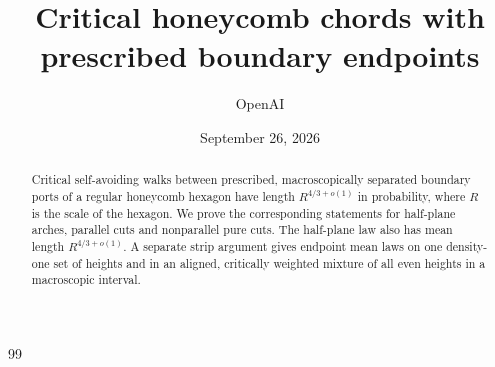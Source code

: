 \documentclass[11pt]{article}
\title{Critical honeycomb chords with prescribed boundary endpoints}
\author{OpenAI}\date{September 26, 2026}
\numberwithin{equation}{section}
\theoremstyle{definition}\newtheorem{definition}[theorem]{Definition}
\theoremstyle{remark}\newtheorem{remark}[theorem]{Remark}
\begin{document}
\maketitle
\begin{abstract}
Critical self-avoiding walks between prescribed, macroscopically separated boundary ports of a regular honeycomb hexagon have length $R^{4/3+o(1)}$ in probability, where $R$ is the scale of the hexagon. We prove the corresponding statements for half-plane arches, parallel cuts and nonparallel pure cuts. The half-plane law also has mean length $R^{4/3+o(1)}$. A separate strip argument gives endpoint mean laws on one density-one set of heights and in an aligned, critically weighted mixture of all even heights in a macroscopic interval.
\end{abstract}
\tableofcontents









\begin{thebibliography}{99}\end{thebibliography}
\end{document}
